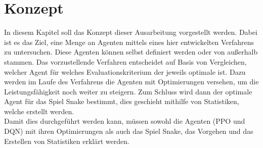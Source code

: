 \chapter{Konzept} \label{chap:Konzept}
In diesem Kapitel soll das Konzept dieser Ausarbeitung vorgestellt werden.
Dabei ist es das Ziel, eine Menge an Agenten mittels eines hier entwickelten Verfahrens zu untersuchen. Diese Agenten können selbst definiert werden oder von außerhalb stammen. Das vorzustellende Verfahren entscheidet auf Basis von Vergleichen, welcher Agent für welches Evaluationskriterium der jeweils optimale ist. Dazu werden im Laufe des Verfahrens die Agenten mit Optimierungen versehen, um die Leistungsfähigkeit noch weiter zu steigern.
Zum Schluss wird dann der optimale Agent für das Spiel Snake bestimmt, dies geschieht mithilfe von Statistiken, welche erstellt werden.\\
Damit dies durchgeführt werden kann, müssen sowohl die Agenten (PPO und DQN) mit ihren Optimierungen als auch das Spiel Snake, das Vorgehen und das Erstellen von Statistiken erklärt werden.


